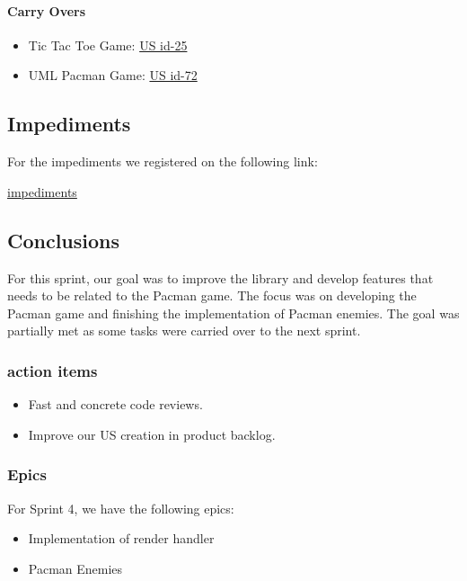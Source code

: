 \paragraph{Carry Overs}
\begin{itemize}
    \item Tic Tac Toe Game: \href{https://tree.taiga.io/project/joseluis-teran-coffeetime/us/25?milestone=395911}{US id-25}
    \item UML Pacman Game: \href{https://tree.taiga.io/project/joseluis-teran-coffeetime/us/72?milestone=395911}{US id-72}
\end{itemize}

\subsection{Impediments}
For the impediments we registered on the following link:

\href{https://docs.google.com/spreadsheets/d/1v_3SvV4162Al9MyRWZ77Oe7ui-eKSd0T5Xl1QH822uc/edit?gid=0#gid=0}{impediments}

\subsection{Conclusions}
For this sprint, our goal was to improve the library and develop features that needs to be related to the Pacman game. The focus was on developing the Pacman game and finishing the implementation of Pacman enemies. The goal was partially met as some tasks were carried over to the next sprint.

\subsubsection{action items}

\begin{itemize}
    \item Fast and concrete code reviews.
    \item Improve our US creation in product backlog.
\end{itemize}

\subsubsection{Epics}

For Sprint 4, we have the following epics:

\begin{itemize}
    \item Implementation of render handler
    \item Pacman Enemies
\end{itemize}
